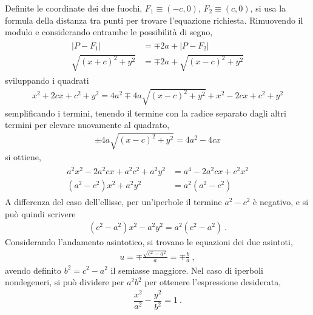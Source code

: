 \documentclass[letterpaper,10pt,italian]{jupyterBook}
\begin{document}
\sphinxAtStartPar
Definite le coordinate dei due fuochi, \(F_1 \equiv (-c,0)\), \(F_2 \equiv (c,0)\), si usa la formula della distanza tra punti per trovare l’equazione richiesta. Rimuovendo il modulo e considerando entrambe le possibilità di segno,
\begin{equation*}
\begin{split}\begin{aligned}
  |P - F_1| & = \mp 2 a + |P - F_2| \\
  \sqrt{(x+c)^2 + y^2} & = \mp 2a + \sqrt{(x-c)^2 + y^2}  
\end{aligned}\end{split}
\end{equation*}
\sphinxAtStartPar
sviluppando i quadrati
\begin{equation*}
\begin{split}x^2 + 2 c x + c^2 + y^2 = 4 a^2 \mp 4a \sqrt{(x-c)^2 + y^2} + x^2 - 2 c x + c^2 + y^2\end{split}
\end{equation*}
\sphinxAtStartPar
semplificando i termini, tenendo il termine con la radice separato dagli altri termini per elevare nuovamente al quadrato,
\begin{equation*}
\begin{split}\pm 4a \sqrt{(x-c)^2 + y^2} = 4 a^2 - 4 c x\end{split}
\end{equation*}
\sphinxAtStartPar
si ottiene,
\begin{equation*}
\begin{split}\begin{aligned}
  a^2 x^2-2 a^2 c x + a^2 c^2 + a^2 y^2 & = a^4 - 2 a^2 c x + c^2 x^2 \\  
  (a^2 - c^2)x^2 + a^2 y^2 & = a^2 ( a^2 - c^2 )
\end{aligned}\end{split}
\end{equation*}
\sphinxAtStartPar
A differenza del caso dell’ellisse, per un’iperbole il termine \(a^2 - c^2\) è negativo, e si può quindi scrivere
\begin{equation*}
\begin{split}(c^2 - a^2) x^2 - a^2 y^2 = a^2 ( c^2 - a^2 ) \ .\end{split}
\end{equation*}
\sphinxAtStartPar
Considerando l’andamento asintotico, si trovano le equazioni dei due asintoti,
\begin{equation*}
\begin{split}u = \mp \frac{\sqrt{c^2-a^2}}{a} = \mp \frac{b}{a} \ ,\end{split}
\end{equation*}
\sphinxAtStartPar
avendo definito \(b^2 = c^2 - a^2\) il semiasse maggiore.
Nel caso di iperboli non\sphinxhyphen{}degeneri, si può dividere per \(a^2 b^2\) per ottenere l’espressione desiderata,
\begin{equation*}
\begin{split}\dfrac{x^2}{a^2} - \dfrac{y^2}{b^2} = 1 \ .\end{split}
\end{equation*}
\sphinxstepscope
\end{document}
